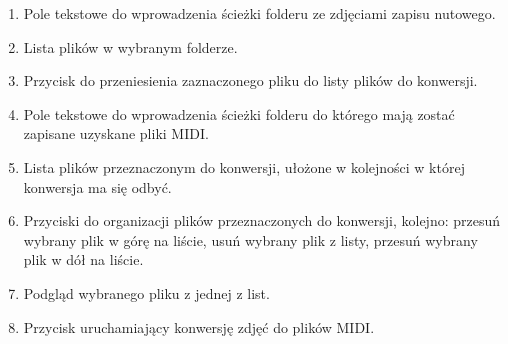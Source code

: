 \begin{enumerate}
	\item Pole tekstowe do wprowadzenia ścieżki folderu ze zdjęciami zapisu nutowego.
	\item Lista plików w wybranym folderze.
	\item Przycisk do przeniesienia zaznaczonego pliku do listy plików do konwersji.
	\item Pole tekstowe do wprowadzenia ścieżki folderu do którego mają zostać zapisane uzyskane pliki MIDI.
	\item Lista plików przeznaczonym do konwersji, ułożone w kolejności w której konwersja ma się odbyć.
	\item Przyciski do organizacji plików przeznaczonych do konwersji, kolejno: przesuń wybrany plik w górę na liście, usuń wybrany plik z listy, przesuń wybrany plik w dół na liście.
	\item Podgląd wybranego pliku z jednej z list.
	\item Przycisk uruchamiający konwersję zdjęć do plików MIDI.
\end{enumerate}